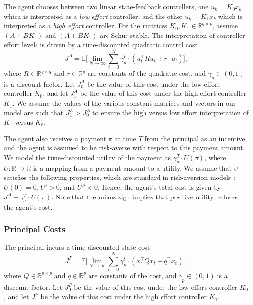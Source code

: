 \documentclass[letterpaper, 10 pt, conference]{ieeeconf}  %
\begin{document}
The agent chooses between two linear state-feedback controllers, one $u_k = K_0 x_k$ which is interpreted as a \emph{low effort} controller, and the other $u_k = K_1 x_k$ which is interpreted as a \emph{high effort} controller. For the matrices $K_0, K_1 \in \mathbb{R}^{q\times p}$, assume  $(A+BK_0)$ and $(A+BK_1)$ are Schur stable. The interpretation of controller effort levels is driven by a time-discounted quadratic control cost
\begin{equation}    
    J^A = \mathbb{E}\Big[ \textstyle\lim_{N \to \infty} \sum_{t=0}^{N}\gamma_a^t \cdot(u_t^\top R u_t + r^\top u_t)\Big],
\end{equation}
where $R \in \mathbb{R}^{q\times q}$ and $r \in \mathbb{R}^q$ are constants of the quadratic cost, and $\gamma_a \in (0,1)$ is a discount factor. Let $J^A_0$ be the value of this cost under the low effort controller $K_0$, and let $J^A_1$ be the value of this cost under the high effort controller $K_1$. We assume the values of the various constant matrices and vectors  in our model are such that $J^A_1 > J^A_0$ to ensure the high versus low effort interpretation of $K_1$ versus $K_0$.

The agent also receives a payment $\pi$ at time $T$ from the principal as an incentive, and the agent is assumed to be risk-averse with respect to this payment amount. We model the time-discounted utility of the payment as $\gamma_a^T\cdot U(\pi)$, where $U: \mathbb{R}\rightarrow\mathbb{R}$ is a mapping from a payment amount to a utility. We assume that $U$ satisfies the following properties, which are standard in risk-aversion models \cite{Laffont}: $U(0) = 0$, $U' > 0$, and $U'' < 0$. 
Hence, the agent's total cost is given by $J^A - \gamma_a^T \cdot U(\pi)$. Note that the minus sign implies that positive utility reduces the agent's cost.%

\subsubsection{Principal Costs}

The principal incurs a time-discounted state cost
\begin{equation}
    J^P = \mathbb{E}\Big[ \textstyle\lim_{N \to \infty} \sum_{t=0}^{N}\gamma_p^t \cdot(x_t^\top Q x_t + q^\top x_t)\Big],
\end{equation}
where $Q \in \mathbb{R}^{p\times p}$ and $q \in \mathbb{R}^p$ are constants of the cost, and $\gamma_p \in (0,1)$ is a discount factor. Let $J^P_0$ be the value of this cost under the low effort controller $K_0$, and let $J^P_1$ be the value of this cost under the high effort controller $K_1$. 
\end{document}
